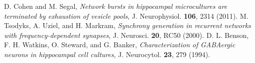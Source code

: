  D. Cohen and M. Segal, \emph{Network bursts in hippocampal microcultures are terminated by exhaustion of vesicle pools}, J. Neurophysiol. \textbf{106}, 2314 (2011).
 M. Tsodyks, A. Uziel, and H. Markram, \emph{Synchrony generation in recurrent networks with frequency-dependent synapses}, J. Neurosci. \textbf{20}, RC50 (2000).
 D. L. Benson, F. H. Watkins, O. Steward, and G. Banker, \emph{Characterization of GABAergic neurons in hippocampal cell cultures}, J. Neurocytol. \textbf{23}, 279 (1994).
